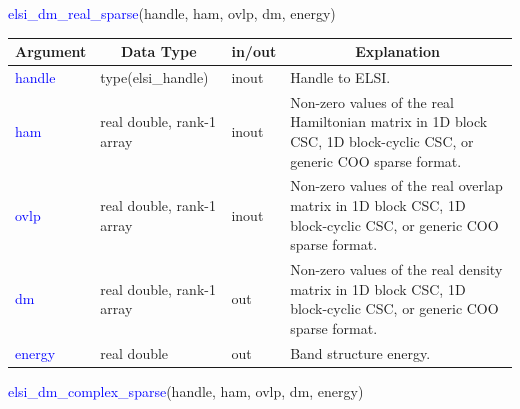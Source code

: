 \documentclass{report}
\begin{document}
\begin{labeling}{\hspace{6cm}}
\item [\hspace{0.3cm} \textcolor{blue}{elsi\_dm\_real\_sparse}(handle, ham, ovlp, dm, energy)]
\end{labeling}

\begin{tabular}[]{|p{20mm}|p{45mm}|p{15mm}|p{85mm}|}
\hline
\multicolumn{1}{|c|}{\textbf{Argument}} & \multicolumn{1}{c|}{\textbf{Data Type}} & \multicolumn{1}{c|}{\textbf{in/out}} & \multicolumn{1}{c|}{\textbf{Explanation}}\\
\hline
\textcolor{blue}{handle} & type(elsi\_handle)        & inout & Handle to ELSI.\\
\hline
\textcolor{blue}{ham}    & real double, rank-1 array & inout & Non-zero values of the real Hamiltonian matrix in 1D block CSC, 1D block-cyclic CSC, or generic COO sparse format.\\
\hline
\textcolor{blue}{ovlp}   & real double, rank-1 array & inout & Non-zero values of the real overlap matrix in 1D block CSC, 1D block-cyclic CSC, or generic COO sparse format.\\
\hline
\textcolor{blue}{dm}     & real double, rank-1 array & out   & Non-zero values of the real density matrix in 1D block CSC, 1D block-cyclic CSC, or generic COO sparse format.\\
\hline
\textcolor{blue}{energy} & real double               & out   & Band structure energy.\\
\hline
\end{tabular}

\begin{labeling}{\hspace{6cm}}
\item [\hspace{0.3cm} \textcolor{blue}{elsi\_dm\_complex\_sparse}(handle, ham, ovlp, dm, energy)]
\end{labeling}
\end{document}

